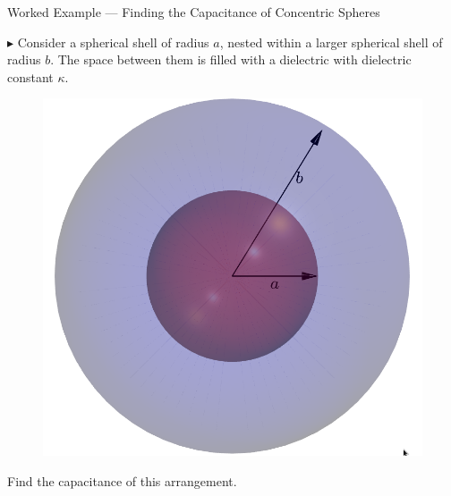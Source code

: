 \documentclass{beamer}
\begin{document}
\begin{frame}{Worked Example --- Finding the Capacitance of Concentric Spheres}

$\blacktriangleright$ Consider a spherical shell of radius $a$, nested within a larger spherical shell of radius $b$. The space between them is filled with a dielectric with dielectric constant $\kappa$.

\begin{figure}
\centering
\includegraphics[height=0.5\textheight]{figures/two.png}
\end{figure}

Find the capacitance of this arrangement.

\end{frame}
\end{document}
